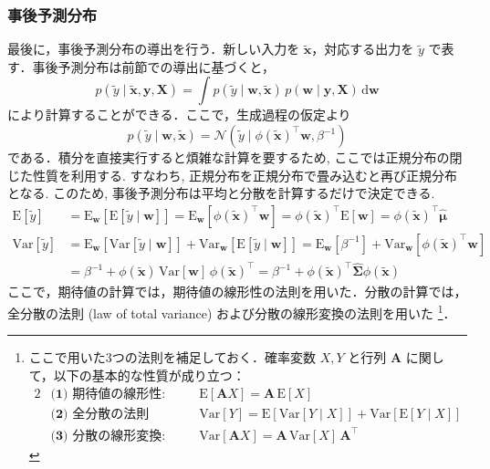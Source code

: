 \documentclass[titlepage]{ltjsbook}
\begin{document}
\subsubsection{事後予測分布}
最後に，事後予測分布の導出を行う．新しい入力を $\tilde{\mathbf{x}}$，対応する出力を $\tilde{y}$ で表す．事後予測分布は前節での導出に基づくと，
\begin{equation}
p(\tilde{y} \mid \tilde{\mathbf{x}},\mathbf{y},\mathbf{X})=\int p(\tilde{y}\mid \mathbf{w},\tilde{\mathbf{x}})\,p(\mathbf{w}\mid \mathbf{y},\mathbf{X})\,\mathrm{d}\mathbf{w}
\end{equation}
により計算することができる．ここで，生成過程の仮定より
\begin{equation}
p(\tilde{y}\mid \mathbf{w},\tilde{\mathbf{x}})=\mathcal{N}\left(\tilde{y}\mid  \phi(\tilde{\mathbf{x}})^\top\mathbf{w}, \beta^{-1}\right)
\end{equation}
である．積分を直接実行すると煩雑な計算を要するため, ここでは正規分布の閉じた性質を利用する. すなわち, 正規分布を正規分布で畳み込むと再び正規分布となる. このため, 事後予測分布は平均と分散を計算するだけで決定できる. 
\begin{align}
\mathrm{E}[\tilde{y}]&=\mathrm{E}_{\mathbf{w}} \left[\mathrm{E}[\tilde{y} \mid \mathbf{w}] \right]=\mathrm{E}_{\mathbf{w}} \left[\phi(\tilde{\mathbf{x}})^\top\mathbf{w} \right]=\phi(\tilde{\mathbf{x}})^\top\mathrm{E}[\mathbf{w}]=\phi(\tilde{\mathbf{x}})^\top\hat{\boldsymbol{\mu}}\\
\mathrm{Var}[\tilde{y}] &= \mathrm{E}_{\mathbf{w}}\left[ \mathrm{Var}[\tilde{y}\mid \mathbf{w}] \right] + \mathrm{Var}_{\mathbf{w}}\left[ \mathrm{E}[\tilde{y} \mid \mathbf{w}] \right]=\mathrm{E}_{\mathbf{w}}\left[\beta^{-1} \right] + \mathrm{Var}_{\mathbf{w}}\left[\phi(\tilde{\mathbf{x}})^\top\mathbf{w} \right]\\
&=\beta^{-1}+\phi(\tilde{\mathbf{x}})\,\mathrm{Var}[\mathbf{w}]\,\phi(\tilde{\mathbf{x}})^\top=\beta^{-1}+\phi(\tilde{\mathbf{x}})^\top\hat{\boldsymbol{\Sigma}} \phi(\tilde{\mathbf{x}})
\end{align}
ここで，期待値の計算では，期待値の線形性の法則を用いた．分散の計算では，全分散の法則 (law of total variance) および分散の線形変換の法則を用いた
\footnote{ここで用いた3つの法則を補足しておく．確率変数 $X, Y$ と行列 $\mathbf{A}$ に関して，以下の基本的な性質が成り立つ：
\begin{alignat*}{2}
&\textbf{(1) 期待値の線形性:} 
&&\quad \mathrm{E}[\mathbf{A}X] = \mathbf{A}\,\mathrm{E}[X] \\
&\textbf{(2) 全分散の法則 (分散分解の法則) :} 
&&\quad \mathrm{Var}[Y] = \mathrm{E}\!\left[\mathrm{Var}[Y\mid X]\right] 
   + \mathrm{Var}\!\left[\mathrm{E}[Y\mid X]\right] \\
&\textbf{(3) 分散の線形変換:} 
&&\quad \mathrm{Var}[\mathbf{A}X] = \mathbf{A}\,\mathrm{Var}[X]\,\mathbf{A}^\top
\end{alignat*}
}．
\end{document}
